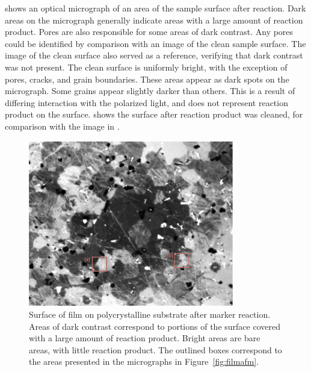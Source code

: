  shows an optical micrograph of an area of the sample surface after
reaction. Dark areas on the micrograph generally indicate areas with a large amount of
reaction product. Pores are also responsible for some areas of dark contrast. Any pores
could be identified by comparison with an image of the clean sample surface. The image of
the clean surface also served as a reference, verifying that dark contrast was not
present. The clean surface is uniformly bright, with the exception of pores, cracks, and
grain boundaries. These areas appear as dark spots on the micrograph. Some grains appear
slightly darker than others. This is a result of differing interaction with the polarized
light, and does not represent reaction product on the surface.  shows
the surface after reaction product was cleaned, for comparison with the image in
.
\begin{figure}
\begin{center}
	\includegraphics[width=0.8\textwidth]{filmoptical.pdf}
		\caption[Film surface after reaction]{%
			Surface of  film on polycrystalline
			 substrate after marker reaction. Areas
			of dark contrast correspond to portions of the surface
			covered with a large amount of reaction product.
			Bright areas are bare areas, with little reaction
			product. The outlined boxes correspond to the areas
			presented in the  micrographs in Figure~\ref{fig:filmafm}. }
	\label{fig:filmoptical}
	\end{center} 
\end{figure}
%
%
